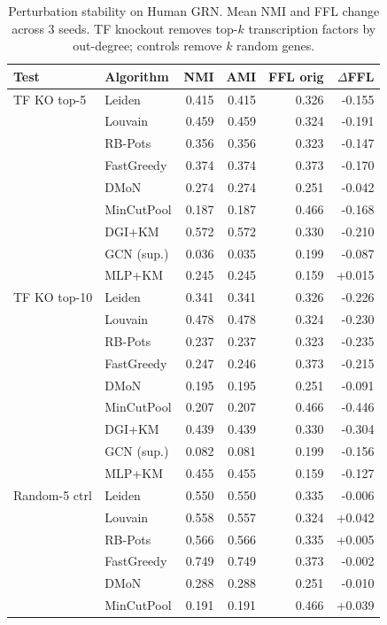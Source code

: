 \begin{table}[ht]
\centering
\caption{Perturbation stability on Human GRN. Mean NMI and FFL change across 3 seeds. TF knockout removes top-$k$ transcription factors by out-degree; controls remove $k$ random genes.}
\label{tab:bio_perturbation}
\footnotesize
\begin{tabular}{llrrrr}
\toprule
Test & Algorithm & NMI & AMI & FFL orig & $\Delta$FFL \\
\midrule
TF KO top-5 & Leiden & 0.415 & 0.415 & 0.326 & -0.155 \\
 & Louvain & 0.459 & 0.459 & 0.324 & -0.191 \\
 & RB-Pots & 0.356 & 0.356 & 0.323 & -0.147 \\
 & FastGreedy & 0.374 & 0.374 & 0.373 & -0.170 \\
 & DMoN & 0.274 & 0.274 & 0.251 & -0.042 \\
 & MinCutPool & 0.187 & 0.187 & 0.466 & -0.168 \\
 & DGI+KM & 0.572 & 0.572 & 0.330 & -0.210 \\
 & GCN (sup.) & 0.036 & 0.035 & 0.199 & -0.087 \\
 & MLP+KM & 0.245 & 0.245 & 0.159 & +0.015 \\
\midrule
TF KO top-10 & Leiden & 0.341 & 0.341 & 0.326 & -0.226 \\
 & Louvain & 0.478 & 0.478 & 0.324 & -0.230 \\
 & RB-Pots & 0.237 & 0.237 & 0.323 & -0.235 \\
 & FastGreedy & 0.247 & 0.246 & 0.373 & -0.215 \\
 & DMoN & 0.195 & 0.195 & 0.251 & -0.091 \\
 & MinCutPool & 0.207 & 0.207 & 0.466 & -0.446 \\
 & DGI+KM & 0.439 & 0.439 & 0.330 & -0.304 \\
 & GCN (sup.) & 0.082 & 0.081 & 0.199 & -0.156 \\
 & MLP+KM & 0.455 & 0.455 & 0.159 & -0.127 \\
\midrule
Random-5 ctrl & Leiden & 0.550 & 0.550 & 0.335 & -0.006 \\
 & Louvain & 0.558 & 0.557 & 0.324 & +0.042 \\
 & RB-Pots & 0.566 & 0.566 & 0.335 & +0.005 \\
 & FastGreedy & 0.749 & 0.749 & 0.373 & -0.002 \\
 & DMoN & 0.288 & 0.288 & 0.251 & -0.010 \\
 & MinCutPool & 0.191 & 0.191 & 0.466 & +0.039 \\

\end{tabular}
\end{table}
